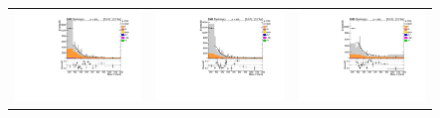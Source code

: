 \begin{figure}[htp]
\begin{tabular}{ccc}
\hspace{-0.5cm}
\includegraphics[scale=0.30]{fig/chapt6/qcd/qcd_mu_ch/Mass_H_binned15_24.pdf}
& \hspace{-1.20cm} \includegraphics[scale=0.30]{fig/chapt6/qcd/qcd_mu_ch/Mass_H_binned24_43.pdf}
& \hspace{-1.20cm} \includegraphics[scale=0.30]{fig/chapt6/qcd/qcd_mu_ch/Mass_H_binned43_Inf.pdf}\\

\end{tabular}
\end{figure}
